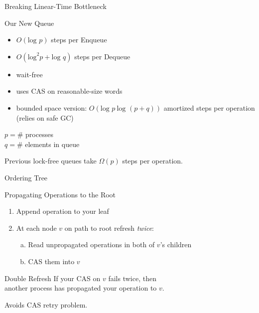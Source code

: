 \documentclass[compress]{beamer}
\newcommand{\op}[1]{\mbox{\sc #1}}
\renewcommand{\log}{\mbox{log }} %
\begin{document}
\begin{frame}{Breaking Linear-Time Bottleneck}

\begin{block}{Our New Queue}
\begin{itemize}
\item $O(\log p)$ steps per \op{Enqueue}
\item $O(\mbox{log}^2 p + \log q)$ steps per \op{Dequeue}
\item wait-free
\item uses CAS on reasonable-size words
\item bounded space version: $O(\log p\ \log(p+q))$ amortized steps per operation
(relies on safe GC)
\end{itemize}
\end{block}

$p = \#$ processes\\
$q = \#$ elements in queue

\medskip

Previous lock-free queues take $\Omega(p)$ steps per operation.

\end{frame}

\begin{frame}{Ordering Tree}

\hspace*{-7mm}
\only<2>{}%
\only<3>{}%

\end{frame}

\begin{frame}{Propagating Operations to the Root}

\begin{enumerate}
\item
Append operation to your leaf
\item
At each node $v$ on path to root refresh {\it twice}:
\begin{enumerate}[(a)]
\item
Read unpropagated operations in both of $v$'s children
\item
CAS them into $v$
\end{enumerate}
\end{enumerate}

\pause
\medskip

\begin{block}{Double Refresh}
If your CAS on $v$ fails twice, then\\
another process has propagated your operation to $v$.
\end{block}

\pause
\medskip
Avoids CAS retry problem.
\end{frame}
\end{document}

